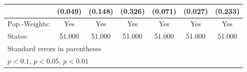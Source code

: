 {\begin{tabular}{l*{6}{c}}
            &     (0.049)         &     (0.148)         &     (0.326)         &     (0.071)         &     (0.027)         &     (0.233)         \\
\hline
Pop.-Weights:&         Yes         &         Yes         &         Yes         &         Yes         &         Yes         &         Yes         \\
States:     &      51.000         &      51.000         &      51.000         &      51.000         &      51.000         &      51.000         \\
\hline\hline
\multicolumn{7}{l}{\footnotesize Standard errors in parentheses}\\
\multicolumn{7}{l}{\footnotesize \sym{*} \(p<0.1\), \sym{**} \(p<0.05\), \sym{***} \(p<0.01\)}\\
\end{tabular}
}
